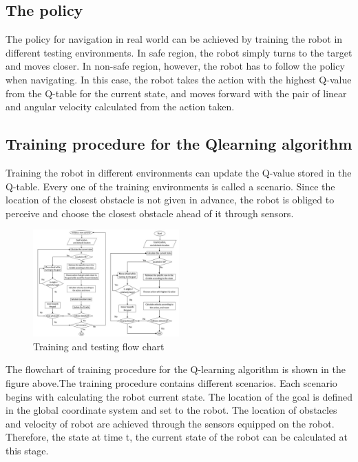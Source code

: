 \documentclass{acmtog} %
\begin{document}
	\subsection{The policy}
	The policy for navigation in real world can be achieved by training the robot in different testing
	environments. In safe region, the robot simply turns to the target and moves closer. In non-safe region, however, the
	robot has to follow the policy when navigating. In this case, the robot takes the action with the highest
	Q-value from the Q-table for the current state, and moves forward with the pair of linear and angular
	velocity calculated from the action taken.
	
	\subsection{Training procedure for the Qlearning algorithm}
	Training the robot in different environments
	can update the Q-value stored in the Q-table. Every one of the training environments is called a
	scenario. Since the location of the closest obstacle is not given in advance, the robot is obliged to
	perceive and choose the closest obstacle ahead of it through sensors.
	\begin{figure}[H]
		\centering
		\includegraphics[width=0.5\textwidth]{tat.PNG}
		\caption{Training and testing flow chart}
		\label{flowchart}
	\end{figure}
	The flowchart of training procedure for the Q-learning algorithm is shown in the figure above.The training
	procedure contains different scenarios. Each scenario begins with calculating the robot current state.
	The location of the goal is defined in the global coordinate system and set to the robot. The location
	of obstacles and velocity of robot are achieved through the sensors equipped on the robot. Therefore,
	the state at time t, the current state of the robot can be calculated at this stage.
	
\end{document}
